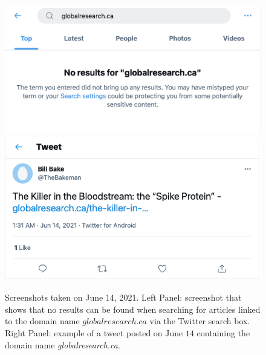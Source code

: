 \documentclass{article}
\begin{document}
\begin{figure}[h]
	\centering
	\includegraphics[scale=0.32]{./img/globalresearch_14_06_2021_16pm_UTC.png} 
	\includegraphics[scale=0.32]{./img/globalresearch/tweet.png} 

	\caption{Screenshots taken on June 14, 2021. Left Panel: screenshot that shows that no results can be found when searching for articles linked to the domain name $globalresearch.ca$ via the Twitter search box. Right Panel: example of a tweet posted on June $14$ containing the domain name {\it globalresearch.ca}. }
		\label{fig3}
\end{figure}

\smallskip
\end{document}

